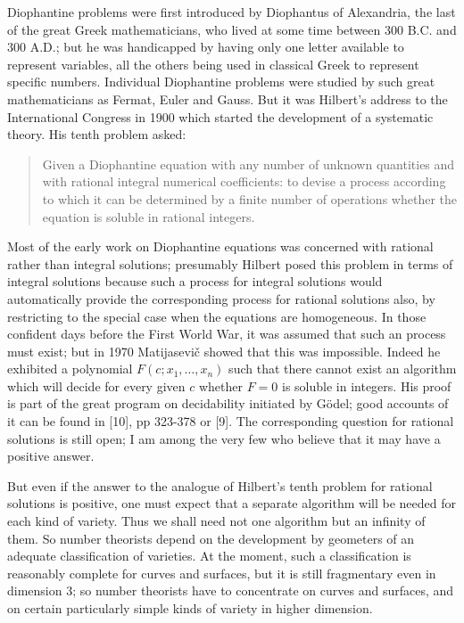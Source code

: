 \documentclass[12pt]{article}
\begin{document}
Diophantine problems were first
introduced by Diophantus of Alexandria, the last of the great Greek
mathematicians, who lived at some time between 300 B.C. and 300 A.D.; but
he was handicapped by having only one letter available to represent
variables, all the others being used in classical Greek
to represent specific numbers.
Individual Diophantine problems were studied by such great mathematicians
as Fermat, Euler and Gauss. But it was Hilbert's address to the International
Congress in 1900 which started the development of a systematic theory. His
tenth problem asked:
\begin{quote}
Given a Diophantine equation with any number of unknown
quantities
and with rational integral numerical coefficients: to devise a process
according to which it can be determined by a finite number of operations
whether the equation is soluble in rational integers.
\end{quote}
Most of the early work on Diophantine equations was concerned with rational
rather than integral solutions; presumably Hilbert posed this problem in
terms of integral solutions because such a process for integral solutions
would automatically provide the corresponding process for rational solutions
also, by restricting to the special case when the equations are homogeneous.
In those confident days before the First World War,
it was assumed that such an process
must exist; but in 1970 Matijasevi\v{c} showed that this was impossible.
Indeed he exhibited a polynomial $F(c;x_1,\ldots,x_n)$ such that
there cannot exist an algorithm which will decide for every given $c$ whether
$F=0$ is soluble in integers. His proof is part of the great program on
decidability initiated by G\"odel; good
accounts of it can be found in [10], pp 323-378 or [9]. The corresponding
question for
rational solutions is still open; I am among the very few who believe
that it may have a positive answer.

But even if the answer to the analogue of Hilbert's tenth problem for rational
solutions is positive, one must expect that a separate algorithm will be needed
for each kind of variety. Thus we shall need not one algorithm but an infinity
of them. So number theorists depend on the development by geometers of an
adequate classification of varieties. At the moment, such a classification is
reasonably complete for curves and surfaces, but it is still fragmentary even
in dimension 3; so number theorists have to concentrate on curves and surfaces,
and on certain particularly simple kinds of variety in higher dimension.
\end{document}
